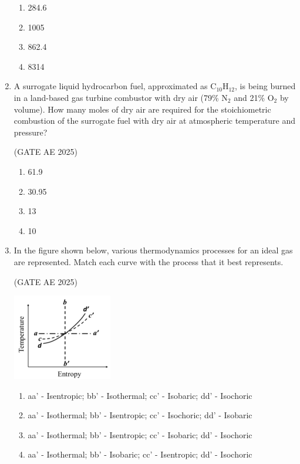 \documentclass[journal,12pt,onecolumn]{IEEEtran}
\theoremstyle{remark}
\begin{document}
\begin{flushleft}
\begin{enumerate}
\begin{enumerate}
    \item 284.6
    \item 1005
    \item 862.4
    \item 8314
\end{enumerate}
   
\item A surrogate liquid hydrocarbon fuel, approximated as C$_{10}$H$_{12}$, is being burned in a land-based gas turbine combustor with dry air (79\% N$_2$ and 21\% O$_2$ by volume). How many moles of dry air are required for the stoichiometric combustion of the surrogate fuel with dry air at atmospheric temperature and pressure?

\hfill (GATE AE 2025)

\begin{enumerate}
    \item 61.9
    \item 30.95
    \item 13
    \item 10
\end{enumerate}

\item In the figure shown below, various thermodynamics processes for an ideal gas are represented. Match each curve with the process that it best represents.

\hfill (GATE AE 2025)

\begin{center}
\includegraphics[width=0.5\columnwidth]{figs/entropy.png}
\caption{}
    \label{fig:placeholder}
\end{center}

\begin{enumerate}
    \item aa' - Isentropic; bb' - Isothermal; cc' - Isobaric; dd' - Isochoric
    \item aa' - Isothermal; bb' - Isentropic; cc' - Isochoric; dd' - Isobaric
    \item aa' - Isothermal; bb' - Isentropic; cc' - Isobaric; dd' - Isochoric
    \item aa' - Isothermal; bb' - Isobaric; cc' - Isentropic; dd' - Isochoric
\end{enumerate}
    

\end{enumerate}
\end{flushleft}
\end{document}
